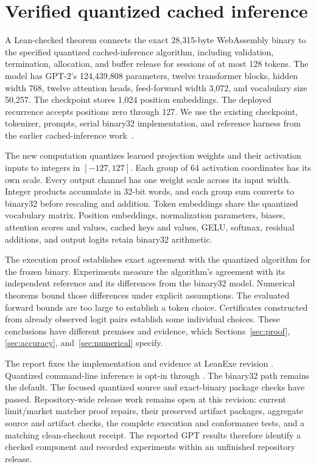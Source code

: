 \section{Verified quantized cached inference}
\label{sec:scope}

A Lean-checked theorem connects the exact 28,315-byte WebAssembly binary to the specified quantized cached-inference algorithm, including validation, termination, allocation, and buffer release for sessions of at most 128 tokens.  The model has GPT-2's 124,439,808 parameters, twelve transformer blocks, hidden width 768, twelve attention heads, feed-forward width 3,072, and vocabulary size 50,257.  The checkpoint stores 1,024 position embeddings.  The deployed recurrence accepts positions zero through 127.  We use the existing checkpoint, tokenizer, prompts, serial binary32 implementation, and reference harness from the earlier cached-inference work~\cite{gpt2,fp32report,comprehensivereport}.

The new computation quantizes learned projection weights and their activation inputs to integers in $[-127,127]$.  Each group of 64 activation coordinates has its own scale.  Every output channel has one weight scale across its input width.  Integer products accumulate in 32-bit words, and each group sum converts to binary32 before rescaling and addition.  Token embeddings share the quantized vocabulary matrix.  Position embeddings, normalization parameters, biases, attention scores and values, cached keys and values, GELU, softmax, residual additions, and output logits retain binary32 arithmetic.

The execution proof establishes exact agreement with the quantized algorithm for the frozen binary.  Experiments measure the algorithm's agreement with its independent reference and its differences from the binary32 model.  Numerical theorems bound those differences under explicit assumptions.  The evaluated forward bounds are too large to establish a token choice.  Certificates constructed from already observed logit pairs establish some individual choices.  These conclusions have different premises and evidence, which Sections~\ref{sec:proof}, \ref{sec:accuracy}, and~\ref{sec:numerical} specify.

The report fixes the implementation and evidence at LeanExe revision .  Quantized command-line inference is opt-in through .  The binary32 path remains the default.  The focused quantized source and exact-binary package checks have passed.  Repository-wide release work remains open at this revision: current limit/market matcher proof repairs, their preserved artifact packages, aggregate source and artifact checks, the complete execution and conformance tests, and a matching clean-checkout receipt.  The reported GPT results therefore identify a checked component and recorded experiments within an unfinished repository release.

